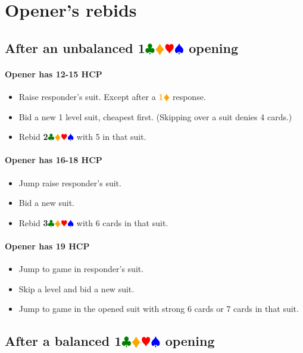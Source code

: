 \documentclass{article}
\newcommand{\Hs}{\textcolor{Red}{$\varheart$}}
\newcommand{\Ss}{\textcolor{Blue}{$\spadesuit$}}
\newcommand{\Ds}{\textcolor{Orange}{$\vardiamond$}}
\newcommand{\Cs}{\textcolor{Green}{$\clubsuit$}}
\newcommand{\D}[1]{\textcolor{Orange}{\textbf{#1}\Ds}}
\newcommand{\suits}[1]{\textbf{#1}\Cs\Ds\Hs\Ss}
\begin{document}
\section{Opener's rebids}

\subsection{After an unbalanced \suits{1} opening}

\paragraph{Opener has 12-15 HCP}

\begin{itemize}
\item Raise responder's suit. Except after a \D{1} response.
\item Bid a new 1 level suit, cheapest first. (Skipping over a suit denies 4 cards.)
\item Rebid \suits{2} with 5 in that suit.
\end{itemize}

\paragraph{Opener has 16-18 HCP}

\begin{itemize}
\item Jump raise responder's suit.
\item Bid a new suit.
\item Rebid \suits{3} with 6 cards in that suit.
\end{itemize}

\paragraph{Opener has 19 HCP}

\begin{itemize}
\item Jump to game in responder's suit.
\item Skip a level and bid a new suit.
\item Jump to game in the opened suit with strong 6 cards or 7 cards in that suit.
\end{itemize}

\subsection{After a balanced \suits{1} opening}
\end{document}
